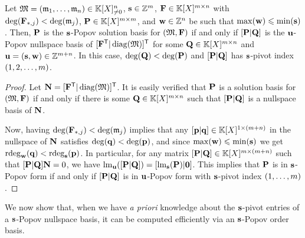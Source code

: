 \documentclass[preprint]{sig-alternate-05-2015}
\begin{document}
\vspace{-0.1cm}
\begin{lem}
  \label{lem:mnb_solbas}
  Let $\Modulus = (\modulus_1,\ldots,\modulus_\nbeq) \in \modSpace^\nbeq$,
  $\shifts\in\shiftSpace$, $\sys \in \sysSpace$ with $\deg(\matcol{\sys}{j}) <
  \deg(\modulus_j)$, $\msb \in \msbSpace$, and $\shifts[w] \in
  \shiftSpace[\nbeq]$ be such that $\max(\shifts[w]) \le \min(\shifts)$.  Then,
  $\msb$ is the $\shifts$-Popov solution basis for $(\Modulus,\sys)$ if and
  only if $[ \msb | \mat{Q} ]$ is the $\shifts[u]$-Popov nullspace basis of
  $\trsp{ [ \trsp{\sys} | \diag{\Modulus} ] }$ for some $\mat{Q} \in
  \polMatSpace[\nbun][\nbeq]$ and $\shifts[u] = (\shifts,\shifts[w]) \in
  \shiftSpace[\nbun+\nbeq]$. In this case, $\deg(\mat{Q}) < \deg(\msb)$ and $[
  \msb | \mat{Q} ]$ has $\shifts$-pivot index $(1,2,\ldots,\nbun)$.
\end{lem}
\begin{proof}
Let $\mat{N} = \trsp{[ \trsp{\sys} | \diag{\Modulus} ]}$. It is easily verified
that $\msb$ is a solution basis for $(\Modulus,\sys)$ if and only if there is
some $\mat{Q}\in \polMatSpace[\nbun][\nbeq]$ such that $[\msb | \mat{Q}]$ is a
nullspace basis of $\mat{N}$.

Now, having $\deg(\matcol{\sys}{j}) < \deg(\modulus_j)$ implies that any
$[\row{p} | \row{q}] \in \polMatSpace[1][(\nbun+\nbeq)]$ in the nullspace of
$\mat{N}$ satisfies $\deg(\row{q}) < \deg(\row{p})$, and since
$\max(\shifts[w]) \le \min(\shifts)$ we get $\rdeg[{\shifts[w]}]{\row{q}} <
\rdeg[\shifts]{\row{p}}$. In particular, for any matrix $[\mat{P} | \mat{Q}]
\in \polMatSpace[\nbun][(\nbun+\nbeq)]$ such that $[\mat{P} | \mat{Q}] \mat{N}
= 0$, we have $\leadingMat[{\shifts[u]}]{[\mat{P}|\mat{Q}]} =
[\leadingMat[\shifts]{\mat{P}} | \mat{0}]$. This implies that $\mat{P}$ is in
$\shifts$-Popov form if and only if $[\mat{P} | \mat{Q}]$ is in
$\shifts[u]$-Popov form with $\shifts$-pivot index $(1,\ldots,\nbun)$.
\vspace{-0.1cm}
\end{proof}

We now show that, when we have \emph{a priori} knowledge about the
$\shifts$-pivot entries of a $\shifts$-Popov nullspace basis, it can be
computed efficiently via an $\shifts$-Popov order basis.
\end{document}
